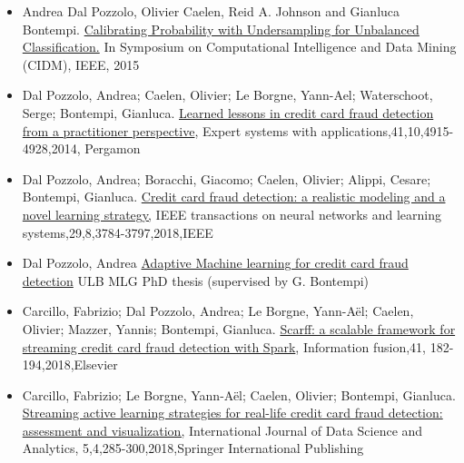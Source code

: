 \documentclass[]{article}
\providecommand{\tightlist}{%
  \setlength{\itemsep}{0pt}\setlength{\parskip}{0pt}}
\begin{document}
\begin{itemize}
\tightlist
\item
  Andrea Dal Pozzolo, Olivier Caelen, Reid A. Johnson and Gianluca
  Bontempi.
  \href{https://www.researchgate.net/publication/283349138_Calibrating_Probability_with_Undersampling_for_Unbalanced_Classification}{Calibrating
  Probability with Undersampling for Unbalanced Classification.} In
  Symposium on Computational Intelligence and Data Mining (CIDM), IEEE,
  2015
\item
  Dal Pozzolo, Andrea; Caelen, Olivier; Le Borgne, Yann-Ael;
  Waterschoot, Serge; Bontempi, Gianluca.
  \href{https://www.researchgate.net/publication/260837261_Learned_lessons_in_credit_card_fraud_detection_from_a_practitioner_perspective}{Learned
  lessons in credit card fraud detection from a practitioner
  perspective}, Expert systems with applications,41,10,4915-4928,2014,
  Pergamon
\item
  Dal Pozzolo, Andrea; Boracchi, Giacomo; Caelen, Olivier; Alippi,
  Cesare; Bontempi, Gianluca.
  \href{https://www.researchgate.net/publication/319867396_Credit_Card_Fraud_Detection_A_Realistic_Modeling_and_a_Novel_Learning_Strategy}{Credit
  card fraud detection: a realistic modeling and a novel learning
  strategy,} IEEE transactions on neural networks and learning
  systems,29,8,3784-3797,2018,IEEE
\item
  Dal Pozzolo, Andrea
  \href{http://di.ulb.ac.be/map/adalpozz/pdf/Dalpozzolo2015PhD.pdf}{Adaptive
  Machine learning for credit card fraud detection} ULB MLG PhD thesis
  (supervised by G. Bontempi)
\item
  Carcillo, Fabrizio; Dal Pozzolo, Andrea; Le Borgne, Yann-Aël; Caelen,
  Olivier; Mazzer, Yannis; Bontempi, Gianluca.
  \href{https://www.researchgate.net/publication/319616537_SCARFF_a_Scalable_Framework_for_Streaming_Credit_Card_Fraud_Detection_with_Spark}{Scarff:
  a scalable framework for streaming credit card fraud detection with
  Spark}, Information fusion,41, 182-194,2018,Elsevier
\item
  Carcillo, Fabrizio; Le Borgne, Yann-Aël; Caelen, Olivier; Bontempi,
  Gianluca.
  \href{https://www.researchgate.net/publication/324615588_Streaming_Active_Learning_Strategies_for_Real-Life_Credit_Card_Fraud_Detection_Assessment_and_Visualization}{Streaming
  active learning strategies for real-life credit card fraud detection:
  assessment and visualization,} International Journal of Data Science
  and Analytics, 5,4,285-300,2018,Springer International Publishing
\end{itemize}
\end{document}
